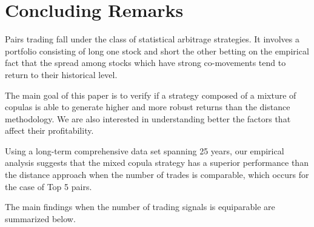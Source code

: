 \documentclass[a4paper]{article}
\begin{document}
	\section{Concluding Remarks}
	
Pairs trading fall under the class of statistical arbitrage strategies. It involves a portfolio consisting of long one stock and short the other betting on the empirical fact that the spread among stocks which have strong co-movements tend to return to their historical level.

The main goal of this paper is to verify if a strategy composed of a mixture of copulas is able to generate higher and more robust returns than the distance methodology. We are also interested in understanding better the factors that affect their profitability. 

Using a long-term comprehensive data set spanning 25 years, our empirical analysis suggests that the mixed copula strategy has a superior performance than the distance approach 
when the number of trades is comparable, which occurs for the case of Top 5 pairs.

 
The main findings when the number of trading signals is equiparable are summarized below.
	
\end{document}
